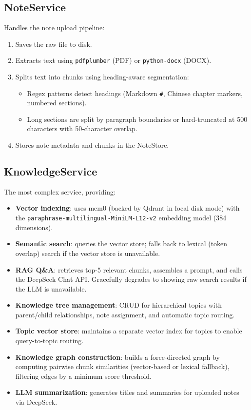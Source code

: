 \documentclass[12pt,a4paper]{article}
\begin{document}
\subsection{NoteService}

Handles the note upload pipeline:

\begin{enumerate}[nosep]
    \item Saves the raw file to disk.
    \item Extracts text using \texttt{pdfplumber} (PDF) or \texttt{python-docx} (DOCX).
    \item Splits text into chunks using heading-aware segmentation:
    \begin{itemize}[nosep]
        \item Regex patterns detect headings (Markdown \texttt{\#}, Chinese chapter markers, numbered sections).
        \item Long sections are split by paragraph boundaries or hard-truncated at 500 characters with 50-character overlap.
    \end{itemize}
    \item Stores note metadata and chunks in the NoteStore.
\end{enumerate}

\subsection{KnowledgeService}

The most complex service, providing:

\begin{itemize}[nosep]
    \item \textbf{Vector indexing}: uses mem0 (backed by Qdrant in local disk mode) with the \texttt{paraphrase-multilingual-MiniLM-L12-v2} embedding model (384 dimensions).
    \item \textbf{Semantic search}: queries the vector store; falls back to lexical (token overlap) search if the vector store is unavailable.
    \item \textbf{RAG Q\&A}: retrieves top-5 relevant chunks, assembles a prompt, and calls the DeepSeek Chat API. Gracefully degrades to showing raw search results if the LLM is unavailable.
    \item \textbf{Knowledge tree management}: CRUD for hierarchical topics with parent/child relationships, note assignment, and automatic topic routing.
    \item \textbf{Topic vector store}: maintains a separate vector index for topics to enable query-to-topic routing.
    \item \textbf{Knowledge graph construction}: builds a force-directed graph by computing pairwise chunk similarities (vector-based or lexical fallback), filtering edges by a minimum score threshold.
    \item \textbf{LLM summarization}: generates titles and summaries for uploaded notes via DeepSeek.
\end{itemize}
\end{document}
